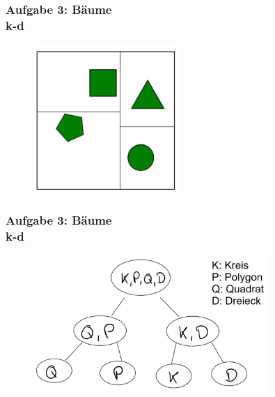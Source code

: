 \documentclass[accentcolor=tud9c,colorbacktitle,inverttitle,landscape,german,presentation,t]{tudbeamer}
\begin{document}
\begin{frame}
	\frametitle{Aufgabe 3: B\"aume \\k-d} 
	\begin{figure}
		\centering
		\includegraphics[width=0.5\textwidth]{K-D}
	\end{figure}
\end{frame}

\begin{frame}
	\frametitle{Aufgabe 3: B\"aume \\k-d} 
	\begin{figure}
		\centering
		\includegraphics[width=0.8\textwidth]{K-D-Nodes}
	\end{figure}
\end{frame}	
\end{document}
